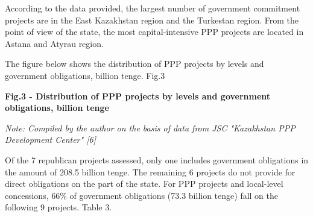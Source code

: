 
\begin{multicols}{2}
According to the data provided, the largest number of government
commitment projects are in the East Kazakhstan region and the Turkestan
region. From the point of view of the state, the most capital-intensive
PPP projects are located in Astana and Atyrau region.

The figure below shows the distribution of PPP projects by levels and
government obligations, billion tenge. Fig.3
\end{multicols}

{\bfseries Fig.3 - Distribution of PPP projects by levels and government obligations, billion tenge}

\emph{Note: Compiled by the author on the basis of data from JSC "Kazakhstan PPP Development Center" {[}6{]}}

Of the 7 republican projects assessed, only one includes government
obligations in the amount of 208.5 billion tenge. The remaining 6
projects do not provide for direct obligations on the part of the state.
For PPP projects and local-level concessions, 66\% of government
obligations (73.3 billion tenge) fall on the following 9 projects. Table
3.

